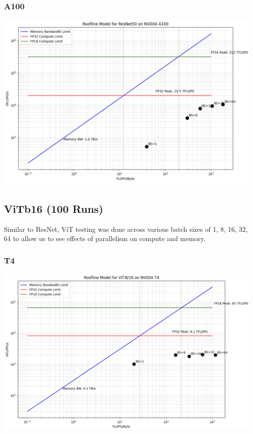 \documentclass[11pt]{article}
\begin{document}
\subsubsection*{A100}
\includegraphics[width=14cm]{resnet/resnet_a100.png}

\subsection*{ViTb16 (100 Runs)}
Similar to ResNet, ViT testing was done across various batch sizes of 1, 8, 16, 32, 64 to allow us to see effects of parallelism on compute and memory.
\subsubsection*{T4}
\includegraphics[width=14cm]{vit/vit_t4.png}
\end{document}
